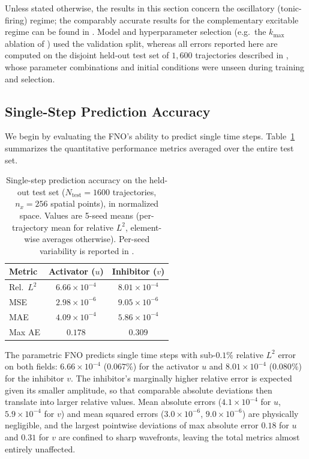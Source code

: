 \documentclass[runningheads]{llncs}
\begin{document}
Unless stated otherwise, the results in this section concern the oscillatory (tonic-firing) regime; the comparably accurate results for the complementary excitable regime can be found in . Model and hyperparameter selection (e.g.\ the $k_{\max}$ ablation of ) used the validation split, whereas all errors reported here are computed on the disjoint held-out test set of $1{,}600$ trajectories described in , whose parameter combinations and initial conditions were unseen during training and selection.

\subsection{Single-Step Prediction Accuracy}
\label{sec:single_step_results}

We begin by evaluating the FNO's ability to predict single time steps. Table~\ref{tab:single_step_metrics} summarizes the quantitative performance metrics averaged over the entire test set.

\begin{table}[!ht]
\centering
\begin{small}
\begin{sc}
\setlength{\tabcolsep}{4pt}
\begin{tabular}{lcc}
\toprule
Metric & Activator ($u$) & Inhibitor ($v$) \\
\midrule
Rel.\ $L^2$ & $6.66 \times 10^{-4}$ & $8.01 \times 10^{-4}$ \\
MSE & $2.98 \times 10^{-6}$ & $9.05 \times 10^{-6}$ \\
MAE & $4.09 \times 10^{-4}$ & $5.86 \times 10^{-4}$ \\
Max AE & $0.178$ & $0.309$ \\
\bottomrule
\end{tabular}
\end{sc}
\end{small}
\smallskip
\caption{Single-step prediction accuracy on the held-out test set ($N_{\text{test}} = 1600$ trajectories, $n_x = 256$ spatial points), in normalized space. Values are 5-seed means (per-trajectory mean for relative $L^2$, element-wise averages otherwise). Per-seed variability is reported in .}
\label{tab:single_step_metrics}
\end{table}

The parametric FNO predicts single time steps with sub-$0.1\%$ relative $L^2$ error on both fields: $6.66 \times 10^{-4}$ ($0.067\%$) for the activator $u$ and $8.01 \times 10^{-4}$ ($0.080\%$) for the inhibitor $v$. The inhibitor's marginally higher relative error is expected given its smaller amplitude, so that comparable absolute deviations then translate into larger relative values. Mean absolute errors ($4.1 \times 10^{-4}$ for $u$, $5.9 \times 10^{-4}$ for $v$) and mean squared errors ($3.0 \times 10^{-6}$, $9.0 \times 10^{-6}$) are physically negligible, and the largest pointwise deviations of max absolute error $0.18$ for $u$ and $0.31$ for $v$ are confined to sharp wavefronts, leaving the total metrics almost entirely unaffected.
\end{document}
